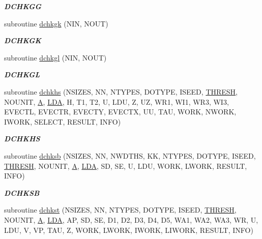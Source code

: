 \begin{DoxyCompactItemize}
\begin{DoxyCompactList}\small\item\em {\bfseries D\+C\+H\+K\+G\+G} \end{DoxyCompactList}\item 
subroutine \hyperlink{group__double__eig_ga4c4c10b0d7b63d96afa90ce5928d6d30}{dchkgk} (N\+I\+N, N\+O\+U\+T)
\begin{DoxyCompactList}\small\item\em {\bfseries D\+C\+H\+K\+G\+K} \end{DoxyCompactList}\item 
subroutine \hyperlink{group__double__eig_ga2e823485a300f7a3e836dde971d0539b}{dchkgl} (N\+I\+N, N\+O\+U\+T)
\begin{DoxyCompactList}\small\item\em {\bfseries D\+C\+H\+K\+G\+L} \end{DoxyCompactList}\item 
subroutine \hyperlink{group__double__eig_ga1c7d85c04f03e5a109a04a119293910b}{dchkhs} (N\+S\+I\+Z\+E\+S, N\+N, N\+T\+Y\+P\+E\+S, D\+O\+T\+Y\+P\+E, I\+S\+E\+E\+D, \hyperlink{zlaqgs_8c_a0656018abfc9fa2821827415f5d5ea57}{T\+H\+R\+E\+S\+H}, N\+O\+U\+N\+I\+T, \hyperlink{classA}{A}, \hyperlink{example__user_8c_ae946da542ce0db94dced19b2ecefd1aa}{L\+D\+A}, H, T1, T2, U, L\+D\+U, Z, U\+Z, W\+R1, W\+I1, W\+R3, W\+I3, E\+V\+E\+C\+T\+L, E\+V\+E\+C\+T\+R, E\+V\+E\+C\+T\+Y, E\+V\+E\+C\+T\+X, U\+U, T\+A\+U, W\+O\+R\+K, N\+W\+O\+R\+K, I\+W\+O\+R\+K, S\+E\+L\+E\+C\+T, R\+E\+S\+U\+L\+T, I\+N\+F\+O)
\begin{DoxyCompactList}\small\item\em {\bfseries D\+C\+H\+K\+H\+S} \end{DoxyCompactList}\item 
subroutine \hyperlink{group__double__eig_ga5ef9e79152c39b707e749d783f40e57b}{dchksb} (N\+S\+I\+Z\+E\+S, N\+N, N\+W\+D\+T\+H\+S, K\+K, N\+T\+Y\+P\+E\+S, D\+O\+T\+Y\+P\+E, I\+S\+E\+E\+D, \hyperlink{zlaqgs_8c_a0656018abfc9fa2821827415f5d5ea57}{T\+H\+R\+E\+S\+H}, N\+O\+U\+N\+I\+T, \hyperlink{classA}{A}, \hyperlink{example__user_8c_ae946da542ce0db94dced19b2ecefd1aa}{L\+D\+A}, S\+D, S\+E, U, L\+D\+U, W\+O\+R\+K, L\+W\+O\+R\+K, R\+E\+S\+U\+L\+T, I\+N\+F\+O)
\begin{DoxyCompactList}\small\item\em {\bfseries D\+C\+H\+K\+S\+B} \end{DoxyCompactList}\item 
subroutine \hyperlink{group__double__eig_ga9fcde518d0efadd400e7ddf07235f188}{dchkst} (N\+S\+I\+Z\+E\+S, N\+N, N\+T\+Y\+P\+E\+S, D\+O\+T\+Y\+P\+E, I\+S\+E\+E\+D, \hyperlink{zlaqgs_8c_a0656018abfc9fa2821827415f5d5ea57}{T\+H\+R\+E\+S\+H}, N\+O\+U\+N\+I\+T, \hyperlink{classA}{A}, \hyperlink{example__user_8c_ae946da542ce0db94dced19b2ecefd1aa}{L\+D\+A}, A\+P, S\+D, S\+E, D1, D2, D3, D4, D5, W\+A1, W\+A2, W\+A3, W\+R, U, L\+D\+U, V, V\+P, T\+A\+U, Z, W\+O\+R\+K, L\+W\+O\+R\+K, I\+W\+O\+R\+K, L\+I\+W\+O\+R\+K, R\+E\+S\+U\+L\+T, I\+N\+F\+O)

\end{DoxyCompactItemize}
